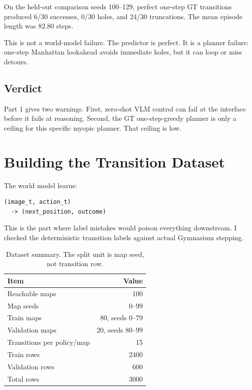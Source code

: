 \documentclass{article}
\begin{document}
On the held-out comparison seeds 100--129, perfect one-step GT transitions produced 6/30 successes, 0/30 holes, and 24/30 truncations. The mean episode length was 82.80 steps.

This is not a world-model failure. The predictor is perfect. It is a planner failure: one-step Manhattan lookahead avoids immediate holes, but it can loop or miss detours.

\subsection{Verdict}

Part 1 gives two warnings. First, zero-shot VLM control can fail at the interface before it fails at reasoning. Second, the GT one-step-greedy planner is only a ceiling for this specific myopic planner. That ceiling is low.

\section{Building the Transition Dataset}

The world model learns:

\begin{verbatim}
(image_t, action_t)
  -> (next_position, outcome)
\end{verbatim}

This is the part where label mistakes would poison everything downstream. I checked the deterministic transition labels against actual Gymnasium stepping.

\begin{table}[t]
\caption{Dataset summary. The split unit is map seed, not transition row.}
\label{tab:dataset}
\centering
\small
\begin{tabular}{lr}
\toprule
Item & Value \\
\midrule
Reachable maps & 100 \\
Map seeds & 0--99 \\
Train maps & 80, seeds 0--79 \\
Validation maps & 20, seeds 80--99 \\
Transitions per policy/map & 15 \\
Train rows & 2400 \\
Validation rows & 600 \\
Total rows & 3000 \\
\bottomrule
\end{tabular}
\end{table}
\end{document}

